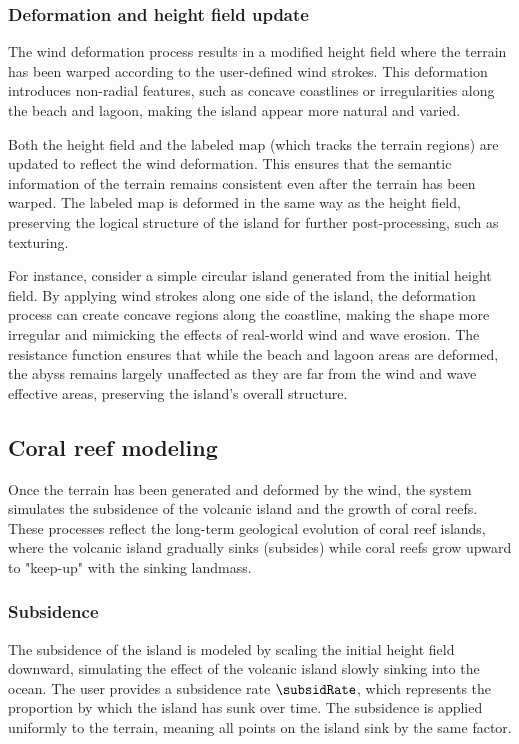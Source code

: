 \subsubsection{Deformation and height field update}

The wind deformation process results in a modified height field where the terrain has been warped according to the user-defined wind strokes. This deformation introduces non-radial features, such as concave coastlines or irregularities along the beach and lagoon, making the island appear more natural and varied.

Both the height field and the labeled map (which tracks the terrain regions) are updated to reflect the wind deformation. This ensures that the semantic information of the terrain remains consistent even after the terrain has been warped. The labeled map is deformed in the same way as the height field, preserving the logical structure of the island for further post-processing, such as texturing.

For instance, consider a simple circular island generated from the initial height field. By applying wind strokes along one side of the island, the deformation process can create concave regions along the coastline, making the shape more irregular and mimicking the effects of real-world wind and wave erosion. The resistance function ensures that while the beach and lagoon areas are deformed, the abyss remains largely unaffected as they are far from the wind and wave effective areas, preserving the island's overall structure.




\subsection{Coral reef modeling}

Once the terrain has been generated and deformed by the wind, the system simulates the subsidence of the volcanic island and the growth of coral reefs. These processes reflect the long-term geological evolution of coral reef islands, where the volcanic island gradually sinks (subsides) while coral reefs grow upward to "keep-up" with the sinking landmass.

\subsubsection{Subsidence}

The subsidence of the island is modeled by scaling the initial height field downward, simulating the effect of the volcanic island slowly sinking into the ocean. The user provides a subsidence rate $\subsidRate$, which represents the proportion by which the island has sunk over time. The subsidence is applied uniformly to the terrain, meaning all points on the island sink by the same factor.

